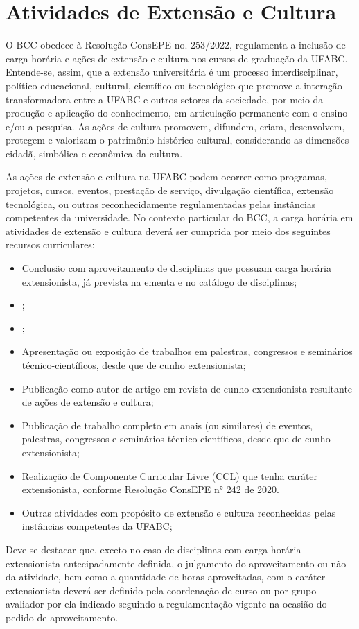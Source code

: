 \section{Atividades de Extensão e Cultura}
\label{sec:extensao}

O BCC obedece à Resolução ConsEPE no. 253/2022, regulamenta a inclusão de carga horária e ações de extensão e cultura nos cursos de graduação da UFABC. Entende-se, assim, que a extensão universitária é um processo interdisciplinar, político educacional, cultural, científico ou tecnológico que promove a interação transformadora entre a UFABC e outros setores da sociedade, por meio da produção e aplicação do conhecimento, em articulação permanente com o ensino e/ou a pesquisa. As ações de cultura promovem, difundem, criam, desenvolvem, protegem e valorizam o patrimônio histórico-cultural, considerando as dimensões cidadã, simbólica e econômica da cultura.

As ações de extensão e cultura na UFABC podem ocorrer como programas, projetos, cursos, eventos, prestação de serviço, divulgação científica, extensão tecnológica, ou outras reconhecidamente regulamentadas pelas instâncias competentes da universidade. 
No contexto particular do BCC, a carga horária em atividades de extensão e cultura deverá ser cumprida por meio dos seguintes recursos curriculares:
\begin{itemize}
	\item Conclusão com aproveitamento de disciplinas que possuam carga horária extensionista, já prevista na ementa e no catálogo de disciplinas;
	\item {}; 
	\item {};
	\item Apresentação ou exposição de trabalhos em palestras, congressos e	seminários técnico-científicos, desde que de cunho extensionista;
	\item Publicação como autor de artigo em revista de cunho extensionista resultante de ações de extensão e cultura;
	\item Publicação de trabalho completo em anais (ou similares) de eventos, palestras, congressos e seminários técnico-científicos, desde que de cunho extensionista;
	\item Realização de Componente Curricular Livre (CCL) que tenha caráter extensionista, conforme Resolução ConsEPE n° 242 de 2020.
	\item Outras atividades com propósito de extensão e cultura reconhecidas pelas instâncias competentes da UFABC;
\end{itemize}

Deve-se destacar que, exceto no caso de disciplinas com carga horária extensionista antecipadamente definida, o julgamento do aproveitamento ou não da atividade, bem como a quantidade de horas aproveitadas, com o caráter extensionista deverá ser definido pela coordenação de curso ou por grupo avaliador por ela indicado seguindo a regulamentação vigente na ocasião do pedido de aproveitamento.
